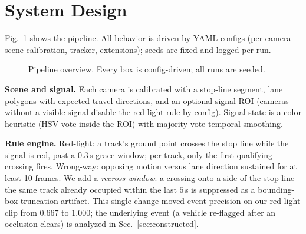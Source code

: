 \documentclass[conference]{IEEEtran}
\begin{document}
\section{System Design}
Fig.~\ref{fig:arch} shows the pipeline. All behavior is driven by YAML
configs (per-camera scene calibration, tracker, extensions); seeds are fixed
and logged per run.

\begin{figure}[t]
\centering
{}
\caption{Pipeline overview. Every box is config-driven; all runs are seeded.}
\label{fig:arch}
\end{figure}

\textbf{Scene and signal.} Each camera is calibrated with a stop-line segment,
lane polygons with expected travel directions, and an optional signal ROI
(cameras without a visible signal disable the red-light rule by config).
Signal state is a color heuristic (HSV vote inside the ROI) with
majority-vote temporal smoothing.

\textbf{Rule engine.} Red-light: a track's ground point crosses the stop line
while the signal is red, past a 0.3\,s grace window; per track, only the
first qualifying crossing fires. Wrong-way: opposing motion versus lane
direction sustained for at least 10 frames. We add a \emph{recross window}:
a crossing onto a side of the stop line the same track already occupied
within the last $5$\,s is suppressed as a bounding-box truncation artifact.
This single change moved event precision on our red-light clip from $0.667$
to $1.000$; the underlying event (a vehicle re-flagged after an occlusion
clears) is analyzed in Sec.~\ref{sec:constructed}.
\end{document}

